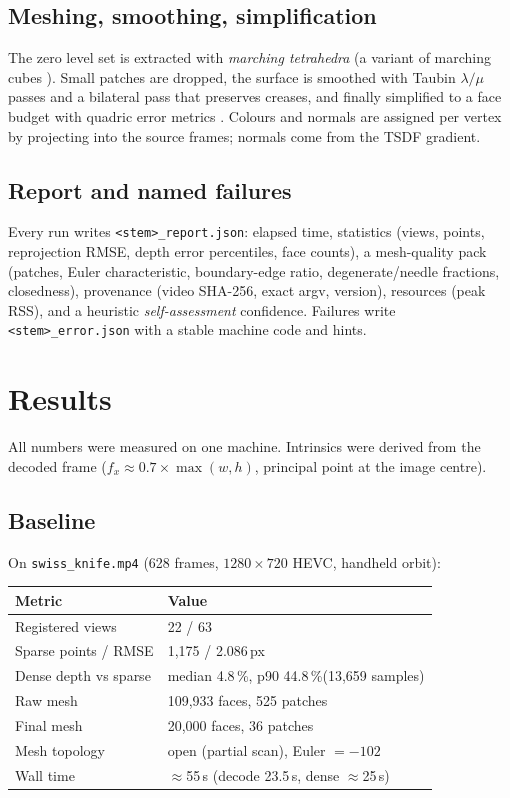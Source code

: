 \documentclass[11pt,a4paper]{article}
\newcommand{\pct}{\,\%}
\newcommand{\code}[1]{\texttt{#1}}
\begin{document}
\subsection{Meshing, smoothing, simplification}
\label{sec:mesh}

The zero level set is extracted with \emph{marching tetrahedra} (a variant of marching cubes
\cite{lorensen1987}). Small patches are dropped, the surface is smoothed with Taubin $\lambda/\mu$
passes \cite{taubin1995} and a bilateral pass that preserves creases, and finally simplified to
a face budget with quadric error metrics \cite{garland1997}. Colours and normals are assigned
per vertex by projecting into the source frames; normals come from the TSDF gradient.

\subsection{Report and named failures}
\label{sec:report}

Every run writes \code{<stem>\_report.json}: elapsed time, statistics (views, points,
reprojection RMSE, depth error percentiles, face counts), a mesh-quality pack (patches, Euler
characteristic, boundary-edge ratio, degenerate/needle fractions, closedness), provenance
(video SHA-256, exact argv, version), resources (peak RSS), and a heuristic \emph{self-assessment}
confidence. Failures write \code{<stem>\_error.json} with a stable machine code and hints.

\section{Results}
\label{sec:results}

All numbers were measured on one machine. Intrinsics were derived from the decoded frame
($f_x \approx 0.7 \times \max(w,h)$, principal point at the image centre).

\subsection{Baseline}
\label{sec:baseline}

On \code{swiss\_knife.mp4} (628 frames, $1280\times720$ HEVC, handheld orbit):

\begin{center}
\begin{tabular}{ll}
\toprule
\textbf{Metric} & \textbf{Value}\\
\midrule
Registered views & 22 / 63\\
Sparse points / RMSE & 1{,}175 / 2.086\,px\\
Dense depth vs sparse & median 4.8\pct, p90 44.8\pct (13{,}659 samples)\\
Raw mesh & 109{,}933 faces, 525 patches\\
Final mesh & 20{,}000 faces, 36 patches\\
Mesh topology & open (partial scan), Euler $=-102$\\
Wall time & $\approx$55\,s (decode 23.5\,s, dense $\approx$25\,s)\\
\bottomrule
\end{tabular}
\end{center}
\end{document}
